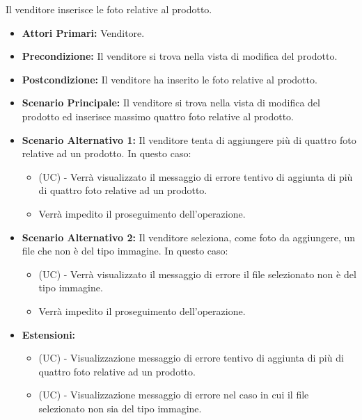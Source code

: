 Il venditore inserisce le foto relative al prodotto.
\begin{itemize}
    \item \textbf{Attori Primari:} Venditore.
    \item \textbf{Precondizione:} Il venditore si trova nella vista di modifica del prodotto.
    \item \textbf{Postcondizione:} Il venditore ha inserito le foto relative al prodotto.
    \item \textbf{Scenario Principale:} Il venditore si trova nella vista di modifica del prodotto ed inserisce massimo quattro foto relative al prodotto.
    \item \textbf{Scenario Alternativo 1:} Il venditore tenta di aggiungere più di quattro foto relative ad un prodotto. In questo caso:
    \begin{itemize}
        \item (UC) - Verrà visualizzato il messaggio di errore tentivo di aggiunta di più di quattro foto relative ad un prodotto.
        \item Verrà impedito il proseguimento dell'operazione.
    \end{itemize}
    \item \textbf{Scenario Alternativo 2:} Il venditore seleziona, come foto da aggiungere, un file che non è del tipo immagine. In questo caso:
    \begin{itemize}
        \item (UC) - Verrà visualizzato il messaggio di errore il file selezionato non è del tipo immagine.
        \item Verrà impedito il proseguimento dell'operazione.
    \end{itemize}
    \item \textbf{Estensioni:}
    \begin{itemize}
        \item (UC) - Visualizzazione messaggio di errore tentivo di aggiunta di più di quattro foto relative ad un prodotto.
        \item (UC) - Visualizzazione messaggio di errore nel caso in cui il file selezionato non sia del tipo immagine.
    \end{itemize}
\end{itemize}

